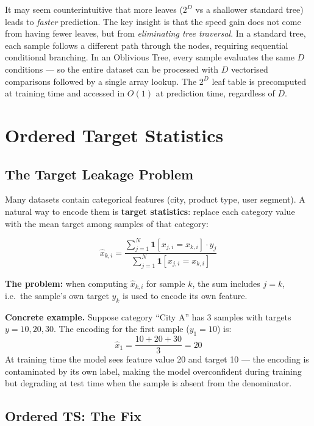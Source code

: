 \documentclass[11pt, a4paper]{article}
\begin{document}
It may seem counterintuitive that more leaves ($2^D$ vs a shallower standard tree)
leads to \emph{faster} prediction. The key insight is that the speed gain
does not come from having fewer leaves, but from \emph{eliminating tree traversal}.
In a standard tree, each sample follows a different path through the nodes,
requiring sequential conditional branching. In an Oblivious Tree,
every sample evaluates the same $D$ conditions --- so the entire dataset
can be processed with $D$ vectorised comparisons followed by a single
array lookup. The $2^D$ leaf table is precomputed at training time
and accessed in $O(1)$ at prediction time, regardless of $D$.

\section{Ordered Target Statistics}

\subsection{The Target Leakage Problem}

Many datasets contain categorical features (city, product type, user segment).
A natural way to encode them is \textbf{target statistics}: replace each
category value with the mean target among samples of that category:

\[
\hat{x}_{k,i} = \frac{\displaystyle\sum_{j=1}^N \mathbf{1}[x_{j,i} = x_{k,i}]\cdot y_j}
                     {\displaystyle\sum_{j=1}^N \mathbf{1}[x_{j,i} = x_{k,i}]}
\]

\textbf{The problem:} when computing $\hat{x}_{k,i}$ for sample $k$,
the sum includes $j = k$, i.e.\ the sample's own target $y_k$ is used
to encode its own feature.

\textbf{Concrete example.}
Suppose category ``City A'' has 3 samples with targets $y = 10, 20, 30$.
The encoding for the first sample ($y_1 = 10$) is:
\[
\hat{x}_{1} = \frac{10 + 20 + 30}{3} = 20
\]
At training time the model sees feature value 20 and target 10 --- the
encoding is contaminated by its own label, making the model overconfident
during training but degrading at test time when the sample is absent from
the denominator.

\subsection{Ordered TS: The Fix}
\end{document}
